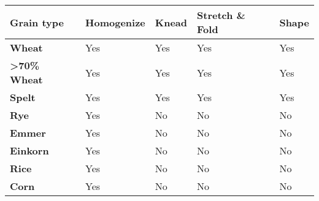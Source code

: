 


\begin{tabular}{|l|l|l|l|l|}
\hline
\textbf{Grain type}              & \textbf{Homogenize} & \textbf{Knead} & \textbf{Stretch \& Fold} & \textbf{Shape} \\ \hline
\textbf{Wheat}                   & Yes                 & Yes            & Yes                      & Yes            \\ \hline
\textbf{\textgreater 70\% Wheat} & Yes                 & Yes            & Yes                      & Yes            \\ \hline
\textbf{Spelt}                   & Yes                 & Yes            & Yes                      & Yes            \\ \hline
\textbf{Rye}                     & Yes                 & No             & No                       & No             \\ \hline
\textbf{Emmer}                   & Yes                 & No             & No                       & No             \\ \hline
\textbf{Einkorn}                 & Yes                 & No             & No                       & No             \\ \hline
\textbf{Rice}                    & Yes                 & No             & No                       & No             \\ \hline
\textbf{Corn}                    & Yes                 & No             & No                       & No             \\ \hline
\end{tabular}

